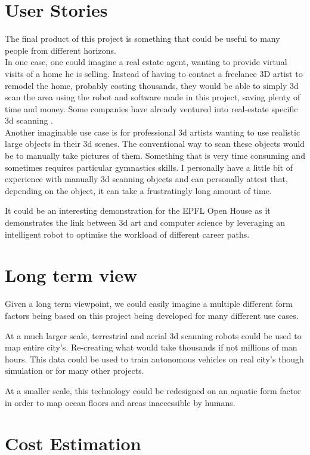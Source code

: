 \documentclass{article}
\begin{document}
\section{User Stories}

The final product of this project is something that could be useful to many people from different horizons. \\
In one case, one could imagine a real estate agent, wanting to provide virtual visits of a home he is selling. Instead of having to contact a freelance 3D artist to remodel the home, probably costing thousands, they would be able to simply 3d scan the area using the robot and software made in this project, saving plenty of time and money. Some companies have already ventured into real-estate specific 3d scanning \cite{matterport}. \\
Another imaginable use case is for professional 3d artists wanting to use realistic large objects in their 3d scenes. The conventional way to scan these objects would be to manually take pictures of them. Something that is very time consuming and sometimes requires particular gymnastics skills.
I personally have a little bit of experience with manually 3d scanning objects and can personally attest that, depending on the object, it can take a frustratingly long amount of time.

It could be an interesting demonstration for the EPFL Open House as it demonstrates the link between 3d art and computer science by leveraging an intelligent robot to optimise the workload of different career paths.

\section{Long term view}

Given a long term viewpoint, we could easily imagine a multiple different form factors being based on this project being developed for many different use cases. 

At a much larger scale, terrestrial and aerial 3d scanning robots could be used to map entire city's. Re-creating what would take thousands if not millions of man hours. This data could be used to train autonomous vehicles on real city's though simulation or for many other projects.

At a smaller scale, this technology could be redesigned on an aquatic form factor in order to map ocean floors and areas inaccessible by humans.
\newpage
\section{Cost Estimation}
\end{document}
